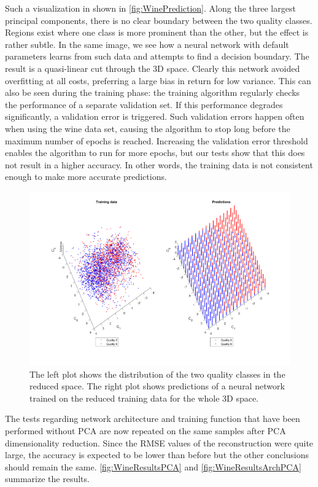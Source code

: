 \documentclass[a4, 10pt, twoside, twocolumn]{article}
\numberwithin{figure}{section}
\begin{document}
Such a visualization in shown in \autoref{fig:WinePrediction}. Along the three largest principal components, there is no clear boundary between the two quality classes. Regions exist where one class is more prominent than the other, but the effect is rather subtle. In the same image, we see how a neural network with default parameters learns from such data and attempts to find a decision boundary. The result is a quasi-linear cut through the 3D space. Clearly this network avoided overfitting at all costs, preferring a large bias in return for low variance. This can also be seen during the training phase: the training algorithm regularly checks the performance of a separate validation set. If this performance degrades significantly, a validation error is triggered. Such validation errors happen often when using the wine data set, causing the algorithm to stop long before the maximum number of epochs is reached. Increasing the validation error threshold enables the algorithm to run for more epochs, but our tests show that this does not result in a higher accuracy. In other words, the training data is not consistent enough to make more accurate predictions.

\begin{figure}[ht]
    \includegraphics[width=\linewidth]{img/WinePrediction.pdf}
    \caption{The left plot shows the distribution of the two quality classes in the reduced space. The right plot shows predictions of a neural network trained on the reduced training data for the whole 3D space.}
    \label{fig:WinePrediction}
\end{figure}

The tests regarding network architecture and training function that have been performed without PCA are now repeated on the same samples after PCA dimensionality reduction. Since the RMSE values of the reconstruction were quite large, the accuracy is expected to be lower than before but the other conclusions should remain the same. \autoref{fig:WineResultsPCA} and \autoref{fig:WineResultsArchPCA} summarize the results.
\end{document}
